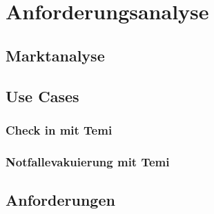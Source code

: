 \chapter{Anforderungsanalyse}
\label{chap:anforderungsanalyse}
\section{Marktanalyse}
\section{Use Cases}
\subsection{Check in mit Temi}
\subsection{Notfallevakuierung mit Temi}
\section{Anforderungen}
